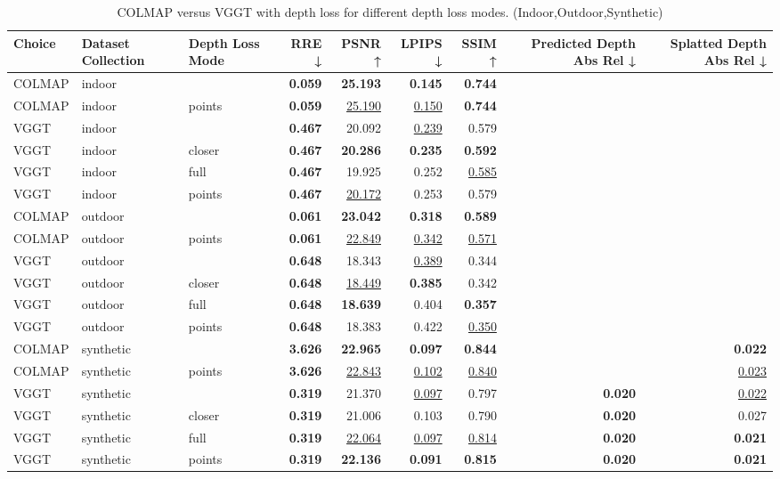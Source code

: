\begin{table}[H]
\caption{\ifdefined\customcaption \customcaption \else COLMAP versus VGGT with depth loss for different depth loss modes. (Indoor,Outdoor,Synthetic) \fi}
\label{tab:05_depth_loss_mode_indoor,outdoor,synthetic}
\centering
\scriptsize
\begin{tabular}{lllrrrrrr}
\toprule
Choice & Dataset Collection & Depth Loss Mode & RRE ↓ & PSNR ↑ & LPIPS ↓ & SSIM ↑ & Predicted Depth Abs Rel ↓ & Splatted Depth Abs Rel ↓ \\
\midrule
COLMAP & indoor &  & \textbf{0.059} & \textbf{25.193} & \textbf{0.145} & \textbf{0.744} &  &  \\
COLMAP & indoor & points & \textbf{0.059} & \underline{25.190} & \underline{0.150} & \textbf{0.744} &  &  \\
\midrule
VGGT & indoor &  & \textbf{0.467} & 20.092 & \underline{0.239} & 0.579 &  &  \\
VGGT & indoor & closer & \textbf{0.467} & \textbf{20.286} & \textbf{0.235} & \textbf{0.592} &  &  \\
VGGT & indoor & full & \textbf{0.467} & 19.925 & 0.252 & \underline{0.585} &  &  \\
VGGT & indoor & points & \textbf{0.467} & \underline{20.172} & 0.253 & 0.579 &  &  \\
\midrule
COLMAP & outdoor &  & \textbf{0.061} & \textbf{23.042} & \textbf{0.318} & \textbf{0.589} &  &  \\
COLMAP & outdoor & points & \textbf{0.061} & \underline{22.849} & \underline{0.342} & \underline{0.571} &  &  \\
\midrule
VGGT & outdoor &  & \textbf{0.648} & 18.343 & \underline{0.389} & 0.344 &  &  \\
VGGT & outdoor & closer & \textbf{0.648} & \underline{18.449} & \textbf{0.385} & 0.342 &  &  \\
VGGT & outdoor & full & \textbf{0.648} & \textbf{18.639} & 0.404 & \textbf{0.357} &  &  \\
VGGT & outdoor & points & \textbf{0.648} & 18.383 & 0.422 & \underline{0.350} &  &  \\
\midrule
COLMAP & synthetic &  & \textbf{3.626} & \textbf{22.965} & \textbf{0.097} & \textbf{0.844} &  & \textbf{0.022} \\
COLMAP & synthetic & points & \textbf{3.626} & \underline{22.843} & \underline{0.102} & \underline{0.840} &  & \underline{0.023} \\
\midrule
VGGT & synthetic &  & \textbf{0.319} & 21.370 & \underline{0.097} & 0.797 & \textbf{0.020} & \underline{0.022} \\
VGGT & synthetic & closer & \textbf{0.319} & 21.006 & 0.103 & 0.790 & \textbf{0.020} & 0.027 \\
VGGT & synthetic & full & \textbf{0.319} & \underline{22.064} & \underline{0.097} & \underline{0.814} & \textbf{0.020} & \textbf{0.021} \\
VGGT & synthetic & points & \textbf{0.319} & \textbf{22.136} & \textbf{0.091} & \textbf{0.815} & \textbf{0.020} & \textbf{0.021} \\
\bottomrule
\end{tabular}
\end{table}